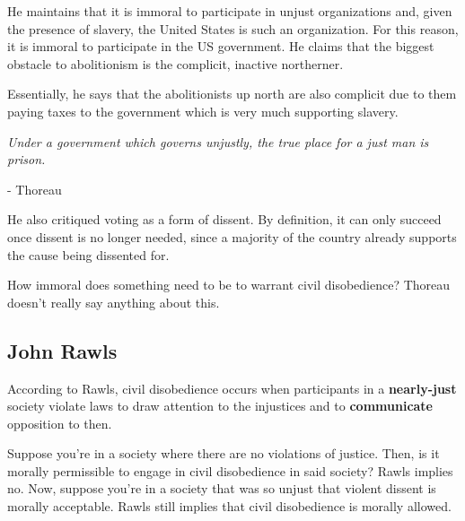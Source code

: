 \documentclass[letterpaper]{article}
\begin{document}
He maintains that it is immoral to participate in unjust organizations and, given the presence of slavery, the United States is such an organization. For this reason, it is immoral to participate in the US government. He claims that the biggest obstacle to abolitionism is the complicit, inactive northerner. 

\bigskip 

Essentially, he says that the abolitionists up north are also complicit due to them paying taxes to the government which is very much supporting slavery.
\begin{mdframed}[]
    \begin{mdframed}[]
        \emph{Under a government which governs unjustly, the true place for a just man is prison.}
    \end{mdframed}
    - Thoreau
\end{mdframed}

He also critiqued voting as a form of dissent. By definition, it can only succeed once dissent is no longer needed, since a majority of the country already supports the cause being dissented for. 

\bigskip 

How immoral does something need to be to warrant civil disobedience? Thoreau doesn't really say anything about this. 

\subsection{John Rawls}
According to Rawls, civil disobedience occurs when participants in a \textbf{nearly-just} society violate laws to draw attention to the injustices and to \textbf{communicate} opposition to then. 

\bigskip 

Suppose you're in a society where there are no violations of justice. Then, is it morally permissible to engage in civil disobedience in said society? Rawls implies no. Now, suppose you're in a society that was so unjust that violent dissent is morally acceptable. Rawls still implies that civil disobedience is morally allowed. 

\bigskip 
\end{document}

